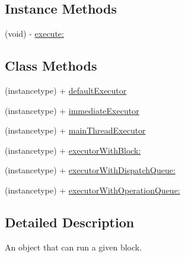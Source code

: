 \subsection*{Instance Methods}
\begin{DoxyCompactItemize}
\item 
(void) -\/ \hyperlink{interface_b_f_executor_a32faf486dcdd09b6895cc337f65060e0}{execute\-:}
\end{DoxyCompactItemize}
\subsection*{Class Methods}
\begin{DoxyCompactItemize}
\item 
(instancetype) + \hyperlink{interface_b_f_executor_a81eae8cce462b2611cbf9a8117f11f9b}{default\-Executor}
\item 
(instancetype) + \hyperlink{interface_b_f_executor_aa09657f4258410d0d8265e0656d96b4e}{immediate\-Executor}
\item 
(instancetype) + \hyperlink{interface_b_f_executor_a63e1382c4dbdcb36ba971e7cbf2cc439}{main\-Thread\-Executor}
\item 
(instancetype) + \hyperlink{interface_b_f_executor_a4b739b49457cdea9c30e9ac0a2b29a57}{executor\-With\-Block\-:}
\item 
(instancetype) + \hyperlink{interface_b_f_executor_aedce1a2c68d49f9218b086f431edcc3f}{executor\-With\-Dispatch\-Queue\-:}
\item 
(instancetype) + \hyperlink{interface_b_f_executor_afa8edfb15d7a47fa4c7ed4394731d716}{executor\-With\-Operation\-Queue\-:}
\end{DoxyCompactItemize}


\subsection{Detailed Description}
An object that can run a given block. 

